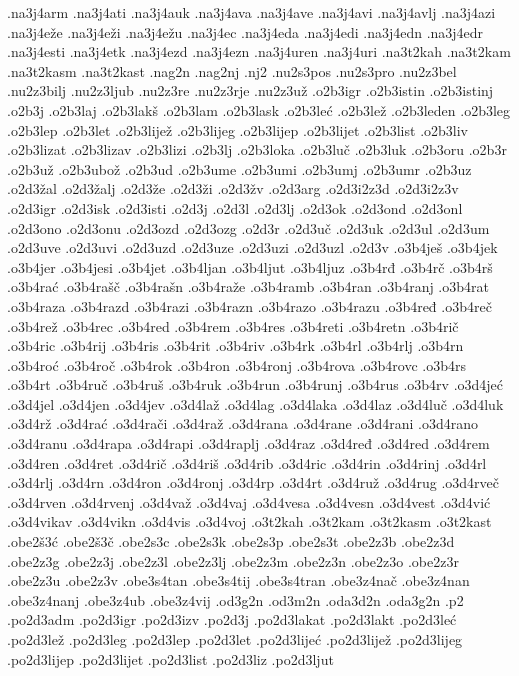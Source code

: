{.na3j4arm
.na3j4ati
.na3j4auk
.na3j4ava
.na3j4ave
.na3j4avi
.na3j4avlj
.na3j4azi
.na3j4eže
.na3j4eži
.na3j4ežu
.na3j4ec
.na3j4eda
.na3j4edi
.na3j4edn
.na3j4edr
.na3j4esti
.na3j4etk
.na3j4ezd
.na3j4ezn
.na3j4uren
.na3j4uri
.na3t2kah
.na3t2kam
.na3t2kasm
.na3t2kast
.nag2n
.nag2nj
.nj2
.nu2s3pos
.nu2s3pro
.nu2z3bel
.nu2z3bilj
.nu2z3ljub
.nu2z3re
.nu2z3rje
.nu2z3už
.o2b3igr
.o2b3istin
.o2b3istinj
.o2b3j
.o2b3laj
.o2b3lakš
.o2b3lam
.o2b3lask
.o2b3leć
.o2b3lež
.o2b3leden
.o2b3leg
.o2b3lep
.o2b3let
.o2b3lijež
.o2b3lijeg
.o2b3lijep
.o2b3lijet
.o2b3list
.o2b3liv
.o2b3lizat
.o2b3lizav
.o2b3lizi
.o2b3lj
.o2b3loka
.o2b3luč
.o2b3luk
.o2b3oru
.o2b3r
.o2b3už
.o2b3ubož
.o2b3ud
.o2b3ume
.o2b3umi
.o2b3umj
.o2b3umr
.o2b3uz
.o2d3žal
.o2d3žalj
.o2d3že
.o2d3ži
.o2d3žv
.o2d3arg
.o2d3i2z3d
.o2d3i2z3v
.o2d3igr
.o2d3isk
.o2d3isti
.o2d3j
.o2d3l
.o2d3lj
.o2d3ok
.o2d3ond
.o2d3onl
.o2d3ono
.o2d3onu
.o2d3ozd
.o2d3ozg
.o2d3r
.o2d3uč
.o2d3uk
.o2d3ul
.o2d3um
.o2d3uve
.o2d3uvi
.o2d3uzd
.o2d3uze
.o2d3uzi
.o2d3uzl
.o2d3v
.o3b4ješ
.o3b4jek
.o3b4jer
.o3b4jesi
.o3b4jet
.o3b4ljan
.o3b4ljut
.o3b4ljuz
.o3b4rđ
.o3b4rč
.o3b4rš
.o3b4rać
.o3b4rašč
.o3b4rašn
.o3b4raže
.o3b4ramb
.o3b4ran
.o3b4ranj
.o3b4rat
.o3b4raza
.o3b4razd
.o3b4razi
.o3b4razn
.o3b4razo
.o3b4razu
.o3b4ređ
.o3b4reč
.o3b4rež
.o3b4rec
.o3b4red
.o3b4rem
.o3b4res
.o3b4reti
.o3b4retn
.o3b4rič
.o3b4ric
.o3b4rij
.o3b4ris
.o3b4rit
.o3b4riv
.o3b4rk
.o3b4rl
.o3b4rlj
.o3b4rn
.o3b4roć
.o3b4roč
.o3b4rok
.o3b4ron
.o3b4ronj
.o3b4rova
.o3b4rovc
.o3b4rs
.o3b4rt
.o3b4ruč
.o3b4ruš
.o3b4ruk
.o3b4run
.o3b4runj
.o3b4rus
.o3b4rv
.o3d4jeć
.o3d4jel
.o3d4jen
.o3d4jev
.o3d4laž
.o3d4lag
.o3d4laka
.o3d4laz
.o3d4luč
.o3d4luk
.o3d4rž
.o3d4rać
.o3d4rači
.o3d4raž
.o3d4rana
.o3d4rane
.o3d4rani
.o3d4rano
.o3d4ranu
.o3d4rapa
.o3d4rapi
.o3d4raplj
.o3d4raz
.o3d4ređ
.o3d4red
.o3d4rem
.o3d4ren
.o3d4ret
.o3d4rič
.o3d4riš
.o3d4rib
.o3d4ric
.o3d4rin
.o3d4rinj
.o3d4rl
.o3d4rlj
.o3d4rn
.o3d4ron
.o3d4ronj
.o3d4rp
.o3d4rt
.o3d4ruž
.o3d4rug
.o3d4rveč
.o3d4rven
.o3d4rvenj
.o3d4važ
.o3d4vaj
.o3d4vesa
.o3d4vesn
.o3d4vest
.o3d4vić
.o3d4vikav
.o3d4vikn
.o3d4vis
.o3d4voj
.o3t2kah
.o3t2kam
.o3t2kasm
.o3t2kast
.obe2š3ć
.obe2š3č
.obe2s3c
.obe2s3k
.obe2s3p
.obe2s3t
.obe2z3b
.obe2z3d
.obe2z3g
.obe2z3j
.obe2z3l
.obe2z3lj
.obe2z3m
.obe2z3n
.obe2z3o
.obe2z3r
.obe2z3u
.obe2z3v
.obe3s4tan
.obe3s4tij
.obe3s4tran
.obe3z4nač
.obe3z4nan
.obe3z4nanj
.obe3z4ub
.obe3z4vij
.od3g2n
.od3m2n
.oda3d2n
.oda3g2n
.p2
.po2d3adm
.po2d3igr
.po2d3izv
.po2d3j
.po2d3lakat
.po2d3lakt
.po2d3leć
.po2d3lež
.po2d3leg
.po2d3lep
.po2d3let
.po2d3lijeć
.po2d3lijež
.po2d3lijeg
.po2d3lijep
.po2d3lijet
.po2d3list
.po2d3liz
.po2d3ljut
}
